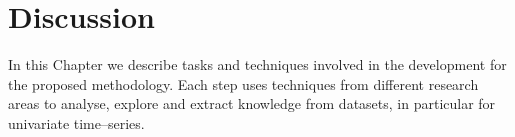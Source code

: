 % 
%

\section{Discussion}
\label{Sec:MethodologyDiscussion}
In this Chapter we describe tasks and techniques involved in the development for the proposed methodology. Each step uses techniques from different research areas to analyse, explore and extract knowledge from datasets, in particular for univariate time--series.

